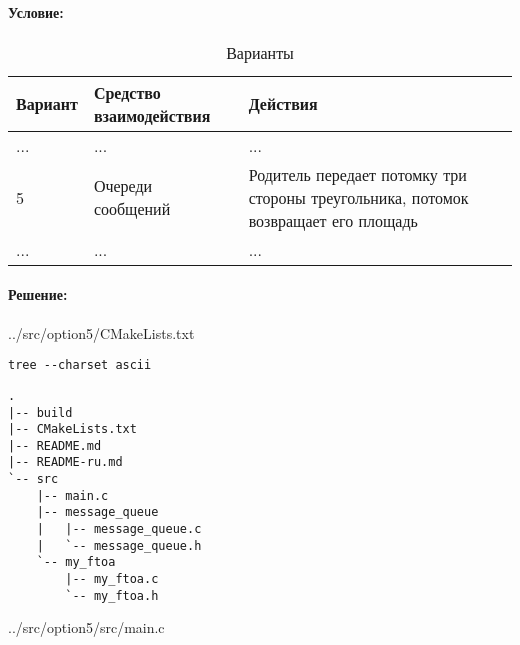 \paragraph{Условие:} \hspace{0pt}

\begin{table}[h]
    \centering{}
    \caption{Варианты}
    \label{table:name}

    \begin{tabular}{|l|l|p{10cm}|}
        \hline
        Вариант &   Средство взаимодействия &   Действия    \\  \hline
        \hline
        ...     &   ...                     &   ...         \\  \hline
        5       &   Очереди сообщений       & Родитель передает потомку три стороны треугольника, потомок возвращает его площадь    \\  \hline
        ...     &   ...                     &   ...         \\  \hline
    \end{tabular}
\end{table}

\paragraph{Решение:} \hspace{0pt}

\noindent\begin{minipage}{.47\textwidth}
    
    {../src/option5/CMakeLists.txt}
\end{minipage}
\hfill
\begin{minipage}{.47\textwidth}
    \begin{lstlisting}[language=Terminal,]
tree --charset ascii
\end{lstlisting}
    \begin{lstlisting}[language=Out,]
.
|-- build
|-- CMakeLists.txt
|-- README.md
|-- README-ru.md
`-- src
    |-- main.c
    |-- message_queue
    |   |-- message_queue.c
    |   `-- message_queue.h
    `-- my_ftoa
        |-- my_ftoa.c
        `-- my_ftoa.h
\end{lstlisting}
\end{minipage}

\newpage


{../src/option5/src/main.c}

\newpage

